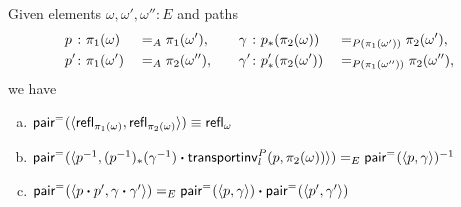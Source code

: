\begin{prop}\label{prop:Sigma-pair=-properties}
    Given elements\/ $\omega,\omega',\omega''\colon E$ and paths
    \begin{alignat*}{4}
    p\phantom{'}
        &\colon\pi_1(\omega)
        &&\eq A\pi_1(\omega'),
        &\quad \gamma\phantom{'}
        &\colon p_*(\pi_2(\omega))
        &&\eq{P(\pi_1(\omega'))} \pi_2(\omega'),\\
    p'
        &\colon\pi_1(\omega')
        &&\eq A\pi_2(\omega''),
        &\quad\gamma'
        &\colon p'_*(\pi_2(\omega'))
        &&\eq{P(\pi_1(\omega''))}\pi_2(\omega''),
    \end{alignat*}
    we have
    \begin{enumerate}[a),font=\upshape]
        \item $\mathsf{pair}^{\mathrel{=_{}}}(\langle\mathsf{refl}_{\pi_1(\omega)},\mathsf{refl}_{\pi_2(\omega)}\rangle)\equiv\mathsf{refl}_\omega$

        \item $\mathsf{pair}^{\mathrel{=_{}}}(\langle p^{-1},(p^{-1})_*(\gamma^{-1})
            \mathbin{\boldsymbol{\cdot}} \mathsf{transportinv}_l^P(p, \pi_2(\omega))\rangle)
            \mathrel{=_{E}}\mathsf{pair}^{\mathrel{=_{}}}(\langle p,\gamma\rangle)^{-1}$
            
        \item $\mathsf{pair}^{\mathrel{=_{}}}(\langle p\mathbin{\boldsymbol{\cdot}} p',\gamma\mathbin{\boldsymbol{\cdot}}\gamma'\rangle)\mathrel{=_{E}}\mathsf{pair}^{\mathrel{=_{}}}(\langle p,\gamma\rangle)\mathbin{\boldsymbol{\cdot}}\mathsf{pair}^{\mathrel{=_{}}}(\langle p',\gamma'\rangle)$
    \end{enumerate}
\end{prop}

